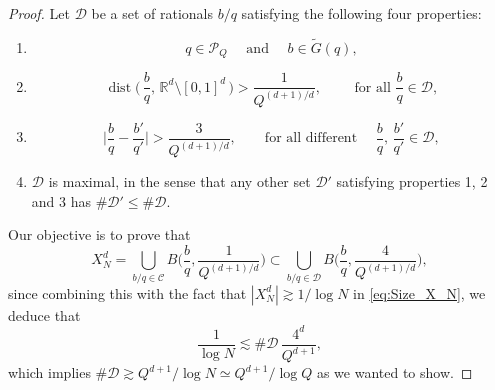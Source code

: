 \documentclass[10pt,a4paper]{amsart}
\begin{document}
\begin{proof}
Let $\mathcal D$ be a set of rationals $b/q$ satisfying the following four properties:
\begin{enumerate}[1.]
    
    \item \[ q \in \mathcal P_Q \quad \text{ and } \quad  b \in \widetilde{G}(q), \]

    \item 
    \begin{equation}
        \operatorname{dist}\Big( \, \frac{b}{q}, \,  \mathbb R^d \setminus [0,1]^d \, \Big) > \frac{1}{Q^{(d+1)/d}},
        \qquad \text{ for all } \frac{b}{q} \in \mathcal D, 
    \end{equation}

    \item 
    \begin{equation}
        \Big| \frac{b}{q} - \frac{b'}{q'} \Big| > \frac{3}{Q^{(d+1)/d}}, 
        \qquad \text{for all different } \quad \frac{b}{q}, \, \frac{b'}{q'} \in \mathcal D,
    \end{equation}

    \item $\mathcal D$ is maximal, in the sense that any other set $\mathcal D'$ satisfying properties 1, 2 and 3 has $\#\mathcal D' \leq \#\mathcal D$. 

\end{enumerate}

Our objective is to prove that
\begin{equation}\label{eq:Cover_Disjoint}
    X_N^d = \bigcup_{b/q \in \mathcal C} B\Big( \frac{b}{q}, \frac{1}{Q^{(d+1)/d}} \Big)  
    \subset 
    \bigcup_{b/q \in \mathcal D} B\Big( \frac{b}{q}, \frac{4}{Q^{(d+1)/d}} \Big), 
\end{equation}
since combining this with the fact that $|X_N^d| \gtrsim 1/\log N $ in \eqref{eq:Size_X_N}, 
we deduce that 
\begin{equation}
    \frac{1}{\log N} \lesssim \#\mathcal D \, \frac{4^d}{Q^{d+1}},
\end{equation}
which implies $\#\mathcal D \gtrsim Q^{d+1}/ \log N \simeq Q^{d+1}/ \log Q$ as we wanted to show. 



\end{proof}
\end{document}
